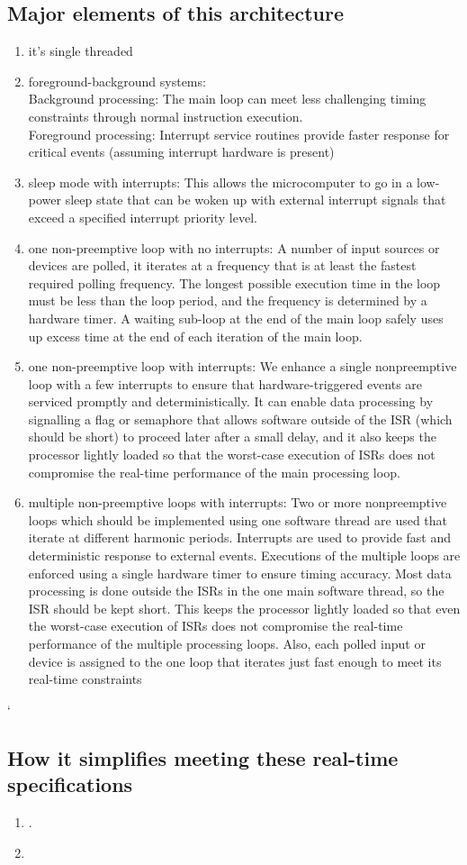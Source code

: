 \subsection{Major elements of this architecture}
\begin{enumerate}
  \item it's single threaded
  \item foreground-background systems:\\
    Background processing: The main loop can meet less challenging timing
constraints through normal instruction execution.\\
Foreground processing: Interrupt service routines provide faster response for
critical events (assuming interrupt hardware is present)
  \item sleep mode with interrupts: This allows the microcomputer to go in a
    low-power sleep state that can be woken up with external interrupt signals that exceed a specified interrupt priority level.
  \item one non-preemptive loop with no interrupts:
    A number of input sources or devices are polled, it iterates at a frequency
    that is at least the fastest required polling frequency. The longest
    possible execution time in the loop must be less than the loop period,
    and the frequency is determined by a hardware timer. 
    A waiting sub-loop at the end of the main loop safely uses
    up excess time at the end of each iteration of the main loop.
  \item one non-preemptive loop with interrupts:
    We enhance a single nonpreemptive loop with a few interrupts to ensure that
    hardware-triggered events are serviced promptly and deterministically.  It
    can enable data processing by signalling a flag or semaphore that allows
    software outside of the ISR (which should be short) to proceed later after a
    small delay, and it also keeps the processor lightly loaded so that the
    worst-case execution of ISRs does not compromise the real-time performance
    of the main processing loop.
  \item multiple non-preemptive loops with interrupts:
   Two or more nonpreemptive loops which should be implemented using one
   software thread are used that iterate at different harmonic periods.
   Interrupts are used to provide fast and deterministic response to external
   events.  Executions of the multiple loops are enforced using a single
   hardware timer to ensure timing accuracy.  Most data processing is done
   outside the ISRs in the one main software thread, so the ISR should be kept
   short.  This keeps the processor lightly loaded so that even the worst-case
   execution of ISRs does not compromise the real-time performance of the
   multiple processing loops.  Also, each polled input or device is assigned to
   the one loop that iterates just fast enough to meet its real-time constraints
  \end{enumerate}
`
\subsection{How it simplifies meeting these real-time specifications}
\begin{enumerate}[label={\alph*)}]
  \item .
  \item 
\end{enumerate}
